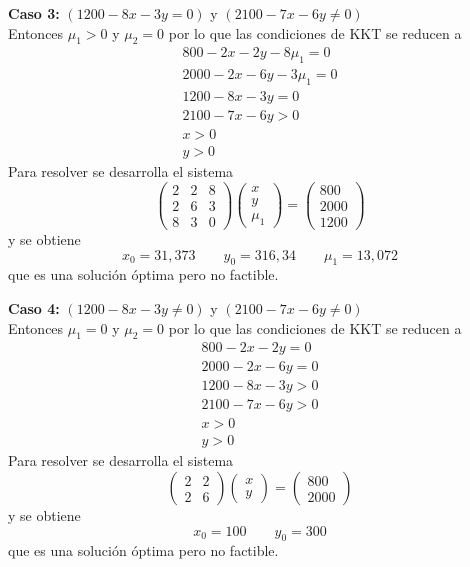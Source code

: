 \begin{solucion}
\textbf{Caso 3:} $(1200-8x-3y=0)$ y $(2100-7x-6y\neq 0)$
\\Entonces $\mu_1 > 0$ y $\mu_2 = 0$ por lo que las condiciones de KKT se reducen a
\begin{align*}
800-2x-2y-8\mu_1		   = 0 \\
2000-2x-6y-3\mu_1		   = 0 \\
1200-8x-3y				   = 0 \\
2100-7x-6y				   > 0 \\
x						   > 0 \\
y						   > 0
\end{align*}
Para resolver se desarrolla el sistema
\[
\begin{pmatrix}
2 & 2 & 8 \\
2 & 6 & 3 \\
8 & 3 & 0 
\end{pmatrix} 
\begin{pmatrix}
x \\ y \\ \mu_1
\end{pmatrix}
=
\begin{pmatrix}
800  \\ 2000 \\ 1200 
\end{pmatrix}
\]
y se obtiene
$$x_0 = 31,373 \qquad y_0 = 316,34 \qquad \mu_1 = 13,072 $$
que es una soluci\'on \'optima pero no factible.

\textbf{Caso 4:} $(1200-8x-3y\neq 0)$ y $(2100-7x-6y\neq 0)$
\\Entonces $\mu_1 = 0$ y $\mu_2 = 0$ por lo que las condiciones de KKT se reducen a
\begin{align*}
800-2x-2y				   = 0 \\
2000-2x-6y				   = 0 \\
1200-8x-3y				   > 0 \\
2100-7x-6y				   > 0 \\
x						   > 0 \\
y						   > 0
\end{align*}
Para resolver se desarrolla el sistema
\[
\begin{pmatrix}
2 & 2 \\
2 & 6 
\end{pmatrix} 
\begin{pmatrix}
x \\ y 
\end{pmatrix}
=
\begin{pmatrix}
800  \\ 2000 
\end{pmatrix}
\]
y se obtiene
$$x_0 = 100 \qquad y_0 = 300$$
que es una soluci\'on \'optima pero no factible.
\end{solucion}

